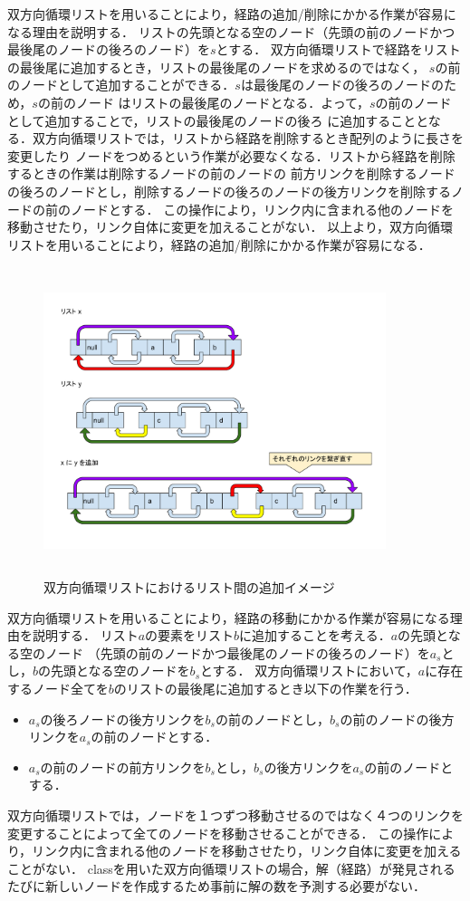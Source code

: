 \documentclass[12pt]{optlab-bachelor}
\begin{document}
双方向循環リストを用いることにより，経路の追加/削除にかかる作業が容易になる理由を説明する．
リストの先頭となる空のノード（先頭の前のノードかつ最後尾のノードの後ろのノード）を$s$とする．
双方向循環リストで経路をリストの最後尾に追加するとき，リストの最後尾のノードを求めるのではなく，
$s$の前のノードとして追加することができる．$s$は最後尾のノードの後ろのノードのため，$s$の前のノード
はリストの最後尾のノードとなる．よって，$s$の前のノードとして追加することで，リストの最後尾のノードの後ろ
に追加することとなる．双方向循環リストでは，リストから経路を削除するとき配列のように長さを変更したり
ノードをつめるという作業が必要なくなる．リストから経路を削除するときの作業は削除するノードの前のノードの
前方リンクを削除するノードの後ろのノードとし，削除するノードの後ろのノードの後方リンクを削除するノードの前のノードとする．
この操作により，リンク内に含まれる他のノードを移動させたり，リンク自体に変更を加えることがない．
以上より，双方向循環リストを用いることにより，経路の追加/削除にかかる作業が容易になる．

\begin{figure}[htbp]
  \centering
  \caption{双方向循環リストにおけるリスト間の追加イメージ}
  \includegraphics[height=9.0cm, width=10.0cm]{fig/fig12.pdf}
\end{figure}

双方向循環リストを用いることにより，経路の移動にかかる作業が容易になる理由を説明する．
リスト$a$の要素をリスト$b$に追加することを考える．$a$の先頭となる空のノード
（先頭の前のノードかつ最後尾のノードの後ろのノード）を$a_s$とし，$b$の先頭となる空のノードを$b_s$とする．
双方向循環リストにおいて，$a$に存在するノード全てを$b$のリストの最後尾に追加するとき以下の作業を行う．
\begin{itemize}
  \item $a_s$の後ろノードの後方リンクを$b_s$の前のノードとし，$b_s$の前のノードの後方リンクを$a_s$の前のノードとする．
  \item $a_s$の前のノードの前方リンクを$b_s$とし，$b_s$の後方リンクを$a_s$の前のノードとする．
\end{itemize}
双方向循環リストでは，ノードを１つずつ移動させるのではなく４つのリンクを変更することによって全てのノードを移動させることができる．
この操作により，リンク内に含まれる他のノードを移動させたり，リンク自体に変更を加えることがない．
classを用いた双方向循環リストの場合，解（経路）が発見されるたびに新しいノードを作成するため事前に解の数を予測する必要がない．
\end{document}
